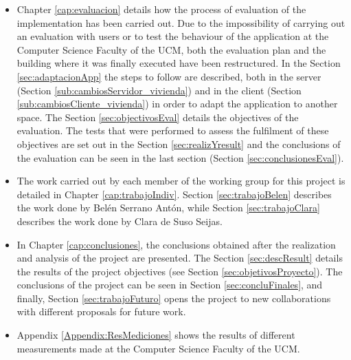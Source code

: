 \begin{itemize}
	\item Chapter \ref{cap:evaluacion} details how the process of evaluation of the implementation has been carried out. Due to the impossibility of carrying out an evaluation with users or to test the behaviour of the application at the Computer Science Faculty of the UCM, both the evaluation plan and the building where it was finally executed have been restructured. In the Section \ref{sec:adaptacionApp} the steps to follow are described, both in the server (Section \ref{sub:cambiosServidor_vivienda}) and in the client (Section \ref{sub:cambiosCliente_vivienda}) in order to adapt the application to another space. The Section \ref{sec:objectivosEval} details the objectives of the evaluation. The tests that were performed to assess the fulfilment of these objectives are set out in the Section \ref{sec:realizYresult} and the conclusions of the evaluation can be seen in the last section (Section \ref{sec:conclusionesEval}).
	
	
	\item The work carried out by each member of the working group for this project is detailed in Chapter \ref{cap:trabajoIndiv}. Section \ref{sec:trabajoBelen} describes the work done by Belén Serrano Antón, while Section \ref{sec:trabajoClara} describes the work done by Clara de Suso Seijas.
	
	\item In Chapter \ref{cap:conclusiones}, the conclusions obtained after the realization and analysis of the project are presented. The Section \ref{sec:descResult} details the results of the project objectives (see Section \ref{sec:objetivosProyecto}). The conclusions of the project can be seen in Section \ref{sec:concluFinales}, and finally, Section \ref{sec:trabajoFuturo} opens the project to new collaborations with different proposals for future work.
	
	\item Appendix \ref{Appendix:ResMediciones} shows the results of different measurements made at the Computer Science Faculty of the UCM.
	
\end{itemize}










